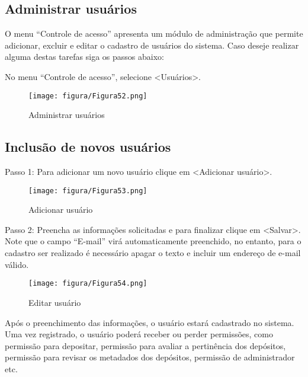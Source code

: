 \documentclass[12pt,hidelinks]{article}
\begin{document}
    \subsection{Administrar usuários}

    O menu “Controle de acesso” apresenta um módulo de administração que permite adicionar, excluir e editar o cadastro de usuários do sistema. Caso deseje realizar alguma destas tarefas siga os passos abaixo:
    
    \singlespacing
    
    No menu “Controle de acesso”, selecione <Usuários>.

    \begin{figure}[!htp]
                \centering
                \texttt{[image: figura/Figura52.png]}
                \caption{Administrar usuários}
            \label{Rotulo}
        \end{figure}

\newpage 

    \subsection{Inclusão de novos usuários}
    
    Passo 1: Para adicionar um novo usuário clique em <Adicionar usuário>.
    
    \begin{figure}[!htp]
                \centering
                \texttt{[image: figura/Figura53.png]}
                \caption{Adicionar usuário}
            \label{Rotulo}
        \end{figure}
        
    Passo 2: Preencha as informações solicitadas e para finalizar clique em <Salvar>. Note que o campo “E-mail” virá automaticamente preenchido, no entanto, para o cadastro ser realizado é necessário apagar o texto e incluir um endereço de e-mail válido.

\newpage

    \begin{figure}[!htp]
                \centering
                \texttt{[image: figura/Figura54.png]}
                \caption{Editar usuário}
            \label{Rotulo}
        \end{figure}
    
    Após o preenchimento das informações, o usuário estará cadastrado no sistema. Uma vez registrado, o usuário poderá receber ou perder permissões, como permissão para depositar, permissão para avaliar a pertinência dos depósitos, permissão para revisar os metadados dos depósitos, permissão de administrador etc.
    
\end{document}

